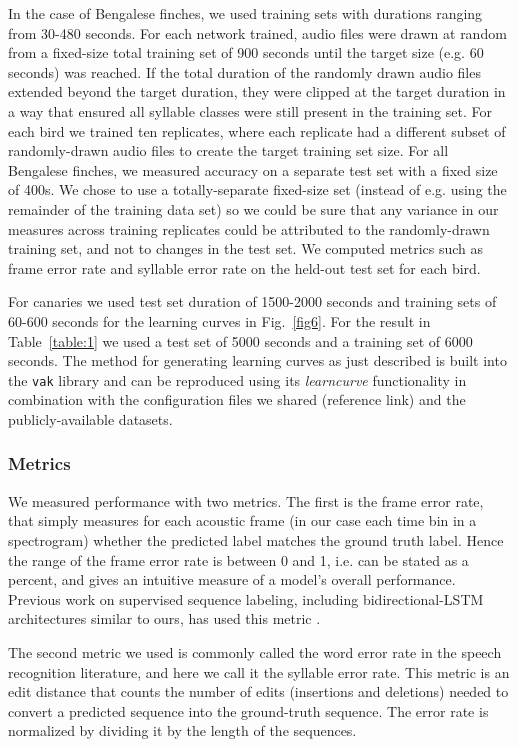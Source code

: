 \documentclass[10pt,letterpaper]{article}
\begin{document}
In the case of Bengalese finches, we used training sets with durations ranging from 30-480 seconds. 
For each network trained, audio files were drawn at random from a fixed-size total training set of 900 seconds 
until the target size (e.g. 60 seconds) was reached. If the total duration of the randomly drawn audio files 
extended beyond the target duration, they were clipped at the target duration 
in a way that ensured all syllable classes were still present in the training set.
For each bird we trained ten replicates, where each 
replicate had a different subset of randomly-drawn audio files to create the target training set size.
For all Bengalese finches, we measured accuracy on a separate test set with a fixed size of 400s. We chose 
to use a totally-separate fixed-size set (instead of e.g. using the remainder of the training data set) so 
we could be sure that any variance in our measures across training replicates could be attributed to 
the randomly-drawn training set, and not to changes in the test set.
We computed metrics such as frame error rate and syllable error rate on the held-out test set for each bird.

For canaries we used test set duration of 1500-2000 seconds and training sets of 60-600 seconds for the learning curves in Fig.~\ref{fig6}. 
For the result in Table~\ref{table:1} we used a test set of 5000 seconds and a training set of 6000 seconds. 
The method for generating learning curves as just described is built into the \texttt{vak} library and 
can be reproduced using its \textit{learncurve} functionality in combination with the configuration files 
we shared (reference link) and the publicly-available datasets.

\subsubsection*{Metrics}
We measured performance with two metrics. The first is the frame error rate, that simply measures for each acoustic frame 
(in our case each time bin in a spectrogram) whether the predicted label matches the ground truth 
label. Hence the range of the frame error rate is between 0 and 1, i.e. can be stated as a percent, and 
gives an intuitive measure of a model's overall performance. Previous work on supervised sequence labeling, including 
bidirectional-LSTM architectures similar to ours, has used this metric \cite{graves_supervised_2012,graves_framewise_2005}.  

The second metric we used is commonly called the word error rate in the speech recognition literature, 
and here we call it the syllable error rate. This metric is an edit distance that counts the number of edits (insertions and deletions) needed to convert a predicted sequence into the ground-truth sequence. The error rate is normalized by dividing it by the length of the sequences.
\end{document}
